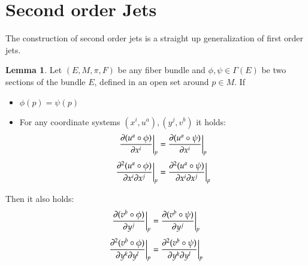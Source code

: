 \documentclass[12pt,a4paper]{report}
\theoremstyle{definition}
\theoremstyle{Theorem}
\newtheorem{Lm}[Def]{Lemma}
\theoremstyle{break}
\theoremstyle{definition}
\begin{document}
	\section{Second order Jets}
	The construction of second order jets is a straight up generalization of first order jets.
	\begin{Lm}
		Let $(E,M,\pi,F)$ be any fiber bundle and $\phi,\psi\in\Gamma(E)$ be two sections of the bundle $E$, defined in an open set around $p\in M$. If
		\begin{itemize}
			\item $\phi(p)=\psi(p)$ 
			\item For any coordinate systems $(x^i,u^a),(y^j,v^b)$ it holds:
			$${\partial(u^a\circ\phi) \over \partial{x^i}}\bigg|_p={\partial(u^a\circ\psi) \over \partial{x^i}}\bigg|_p$$
			$${\partial^2(u^a\circ\phi) \over \partial{x^i}\partial{x^j}}\bigg|_p={\partial^2(u^a\circ\psi) \over \partial{x^i}\partial{x^j}}\bigg|_p$$
		\end{itemize} 
		Then it also holds:
		$${\partial(v^b\circ\phi) \over \partial{y^j}}\bigg|_p={\partial(v^b\circ\psi) \over \partial{y^j}}\bigg|_p$$
		$${\partial^2(v^b\circ\phi) \over \partial{y^k}\partial{y^l}}\bigg|_p={\partial^2(v^b\circ\psi) \over \partial{y^k}\partial{y^l}}\bigg|_p$$
	\end{Lm}
\end{document}
